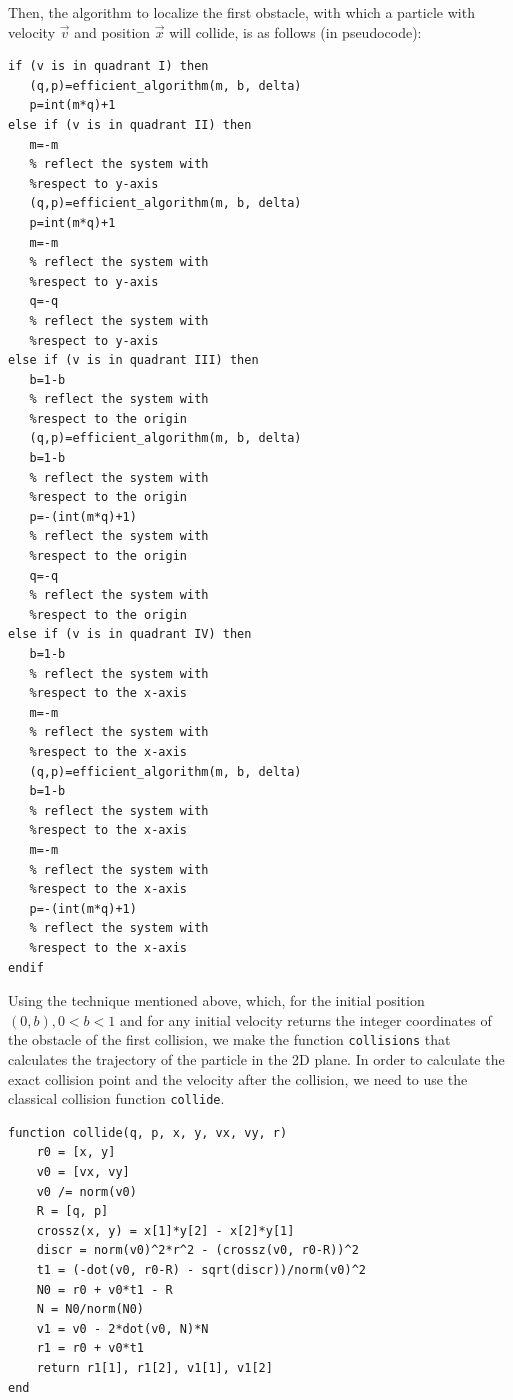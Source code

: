 \documentclass[prl,amsmath,amssymb, twocolumn, showpacs]{revtex4-1}
\begin{document}
Then, the algorithm to localize the first obstacle, with which a particle with velocity $\vec{v}$ and position $\vec{x}$ will collide, is as follows (in pseudocode): 

\begin{verbatim}
if (v is in quadrant I) then     
   (q,p)=efficient_algorithm(m, b, delta)
   p=int(m*q)+1
else if (v is in quadrant II) then
   m=-m                               
   % reflect the system with 
   %respect to y-axis 
   (q,p)=efficient_algorithm(m, b, delta)
   p=int(m*q)+1
   m=-m                                
   % reflect the system with 
   %respect to y-axis
   q=-q                                
   % reflect the system with 
   %respect to y-axis
else if (v is in quadrant III) then
   b=1-b                              
   % reflect the system with 
   %respect to the origin
   (q,p)=efficient_algorithm(m, b, delta)
   b=1-b                              
   % reflect the system with 
   %respect to the origin
   p=-(int(m*q)+1)                               
   % reflect the system with 
   %respect to the origin
   q=-q                               
   % reflect the system with 
   %respect to the origin
else if (v is in quadrant IV) then
   b=1-b                              
   % reflect the system with 
   %respect to the x-axis
   m=-m                               
   % reflect the system with 
   %respect to the x-axis
   (q,p)=efficient_algorithm(m, b, delta)             
   b=1-b                              
   % reflect the system with 
   %respect to the x-axis
   m=-m                               
   % reflect the system with 
   %respect to the x-axis
   p=-(int(m*q)+1)                               
   % reflect the system with 
   %respect to the x-axis
endif
\end{verbatim}

Using the technique mentioned above, which, for the initial position $(0, b), 0 < b < 1$ and for any initial velocity returns the integer coordinates of the obstacle of the first collision, we make the function \texttt{collisions} that calculates the trajectory of the particle in the 2D plane. In order to calculate the exact collision point and the velocity after the collision, we need to use the classical collision function \texttt{collide}.

\begin{verbatim}
function collide(q, p, x, y, vx, vy, r)
    r0 = [x, y]
    v0 = [vx, vy]
    v0 /= norm(v0)
    R = [q, p]
    crossz(x, y) = x[1]*y[2] - x[2]*y[1]
    discr = norm(v0)^2*r^2 - (crossz(v0, r0-R))^2
    t1 = (-dot(v0, r0-R) - sqrt(discr))/norm(v0)^2
    N0 = r0 + v0*t1 - R
    N = N0/norm(N0)
    v1 = v0 - 2*dot(v0, N)*N
    r1 = r0 + v0*t1
    return r1[1], r1[2], v1[1], v1[2]
end
\end{verbatim}
\end{document}
